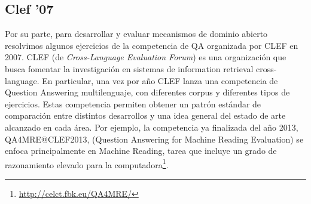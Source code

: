 \subsection{Clef '07}
\label{subsec:clef07}
Por su parte, para desarrollar y evaluar mecanismos de dominio abierto resolvimos algunos ejercicios de la competencia de QA organizada por CLEF 
en 2007. 
CLEF (de \textit{Cross-Language Evaluation Forum}) es una organización que busca fomentar la investigación en sistemas de information retrieval cross-language. 
En particular, una vez por año CLEF lanza una competencia de Question Answering multilenguaje, con diferentes corpus y diferentes tipos de ejercicios. Estas competencia permiten obtener un patrón estándar de comparación entre distintos desarrollos y una idea general del estado de arte alcanzado en cada área.
Por ejemplo, la competencia ya finalizada del año 2013, QA4MRE@CLEF2013, (Question Answering for Machine Reading Evaluation) se enfoca principalmente en Machine Reading, tarea que incluye un grado de razonamiento elevado para la computadora\footnote{\url{http://celct.fbk.eu/QA4MRE/}}.

